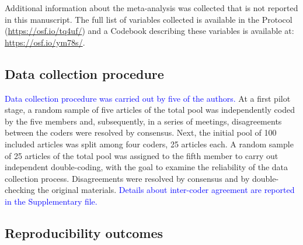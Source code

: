 \documentclass[
  ,man,floatsintext]{apa6}
\begin{document}
Additional information about the meta-analysis was collected that is not reported in this manuscript. The full list of variables collected is available in the Protocol (\url{https://osf.io/tq4uf/}) and a Codebook describing these variables is available at: \url{https://osf.io/ym78s/}.

\hypertarget{data-collection-procedure}{%
\subsection{Data collection procedure}\label{data-collection-procedure}}

\textcolor{blue}{Data collection procedure was carried out by five of the authors.} At a first pilot stage, a random sample of five articles of the total pool was independently coded by the five members and, subsequently, in a series of meetings, disagreements between the coders were resolved by consensus. Next, the initial pool of 100 included articles was split among four coders, 25 articles each. A random sample of 25 articles of the total pool was assigned to the fifth member to carry out independent double-coding, with the goal to examine the reliability of the data collection process. Disagreements were resolved by consensus and by double-checking the original materials. \textcolor{blue}{Details about inter-coder agreement are reported in the Supplementary file.}

\hypertarget{reproducibility-outcomes}{%
\subsection{Reproducibility outcomes}\label{reproducibility-outcomes}}
\end{document}
